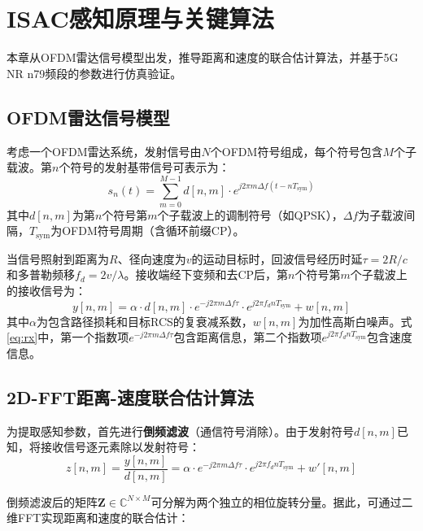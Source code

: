 \section{ISAC感知原理与关键算法}

本章从OFDM雷达信号模型出发，推导距离和速度的联合估计算法，并基于5G NR n79频段的参数进行仿真验证。

\subsection{OFDM雷达信号模型}

考虑一个OFDM雷达系统，发射信号由$N$个OFDM符号组成，每个符号包含$M$个子载波。第$n$个符号的发射基带信号可表示为：
\begin{equation}
  s_n(t) = \sum_{m=0}^{M-1} d[n,m] \cdot e^{j2\pi m \Delta f (t - nT_{\mathrm{sym}})}
  \label{eq:tx}
\end{equation}
其中$d[n,m]$为第$n$个符号第$m$个子载波上的调制符号（如QPSK），$\Delta f$为子载波间隔，$T_{\mathrm{sym}}$为OFDM符号周期（含循环前缀CP）。

当信号照射到距离为$R$、径向速度为$v$的运动目标时，回波信号经历时延$\tau = 2R/c$和多普勒频移$f_d = 2v/\lambda$。接收端经下变频和去CP后，第$n$个符号第$m$个子载波上的接收信号为：
\begin{equation}
  y[n,m] = \alpha \cdot d[n,m] \cdot e^{-j2\pi m \Delta f \tau} \cdot e^{j2\pi f_d n T_{\mathrm{sym}}} + w[n,m]
  \label{eq:rx}
\end{equation}
其中$\alpha$为包含路径损耗和目标RCS的复衰减系数，$w[n,m]$为加性高斯白噪声。式\eqref{eq:rx}中，第一个指数项$e^{-j2\pi m \Delta f \tau}$包含距离信息，第二个指数项$e^{j2\pi f_d n T_{\mathrm{sym}}}$包含速度信息。

\subsection{2D-FFT距离-速度联合估计算法}

为提取感知参数，首先进行\textbf{倒频滤波}（通信符号消除）。由于发射符号$d[n,m]$已知，将接收信号逐元素除以发射符号：
\begin{equation}
  z[n,m] = \frac{y[n,m]}{d[n,m]} = \alpha \cdot e^{-j2\pi m \Delta f \tau} \cdot e^{j2\pi f_d n T_{\mathrm{sym}}} + w'[n,m]
  \label{eq:demod}
\end{equation}

倒频滤波后的矩阵$\mathbf{Z} \in \mathbb{C}^{N \times M}$可分解为两个独立的相位旋转分量。据此，可通过二维FFT实现距离和速度的联合估计：

